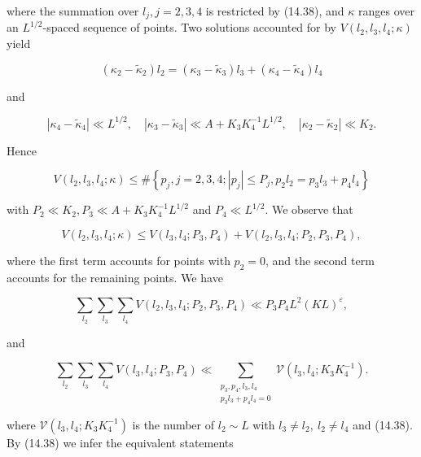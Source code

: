 \documentclass[10pt]{article}
\begin{document}
where the summation over $l_{j}, j=2,3,4$ is restricted by (14.38), and $\kappa$ ranges over an $L^{1 / 2}$-spaced sequence of points. Two solutions accounted for by $V\left(l_{2}, l_{3}, l_{4} ; \kappa\right)$ yield

$$
\left(\kappa_{2}-\widetilde{\kappa}_{2}\right) l_{2}=\left(\kappa_{3}-\widetilde{\kappa}_{3}\right) l_{3}+\left(\kappa_{4}-\widetilde{\kappa}_{4}\right) l_{4}
$$

and

$$
\left|\kappa_{4}-\widetilde{\kappa}_{4}\right| \ll L^{1 / 2}, \quad\left|\kappa_{3}-\widetilde{\kappa}_{3}\right|\ll A+K_{3} K_{4}^{-1} L^{1 / 2}, \quad\left|\kappa_{2}-\widetilde{\kappa}_{2}\right| \ll K_{2} .
$$

Hence

$$
V\left(l_{2}, l_{3}, l_{4} ; \kappa\right) \leqslant \#\left\{p_{j}, j=2,3,4 ;\left|p_{j}\right| \leqslant P_{j}, p_{2} l_{2}=p_{3} l_{3}+p_{4} l_{4}\right\}
$$

with $P_{2} \ll K_{2}, P_{3} \ll A+K_{3} K_{4}^{-1} L^{1 / 2}$ and $P_{4} \ll L^{1 / 2}$. We observe that


\begin{equation*}
V\left(l_{2}, l_{3}, l_{4} ; \kappa\right) \leqslant V\left(l_{3}, l_{4} ; P_{3}, P_{4}\right)+V\left(l_{2}, l_{3}, l_{4} ; P_{2}, P_{3}, P_{4}\right), \tag{14.41}
\end{equation*}


where the first term accounts for points with $p_{2}=0$, and the second term accounts for the remaining points. We have


\begin{equation*}
\sum_{l_{2}} \sum_{l_{3}} \sum_{l_{4}} V\left(l_{2}, l_{3}, l_{4} ; P_{2}, P_{3}, P_{4}\right) \ll P_{3} P_{4} L^{2}(K L)^{\varepsilon}, \tag{14.42}
\end{equation*}


and


\begin{equation*}
\sum_{l_{2}}\sum_{l_{3}}\sum_{l_{4}}V(l_{3},l_{4};P_{3},P_{4})
\ll\sum_{\substack{p_{3},p_{4},l_{3},l_{4}\\ p_{3}l_{3}+p_{4}l_{4}=0}}
\mathscr{V}(l_{3},l_{4};K_{3}K_{4}^{-1}). \tag{14.43}
\end{equation*}


where $\mathscr{V}\left(l_{3}, l_{4} ; K_{3} K_{4}^{-1}\right)$ is the number of $l_{2} \sim L$ with $l_{3}\neq l_{2},\ l_{2}\neq l_{4}$ and (14.38). By (14.38) we infer the equivalent statements
\end{document}
